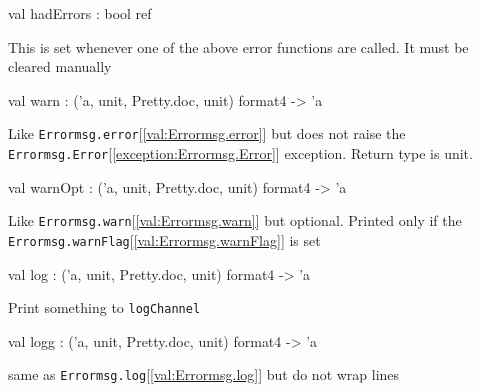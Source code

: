 \documentclass[11pt]{article}
\begin{document}
\label{val:Errormsg.hadErrors}\begin{ocamldoccode}
val hadErrors : bool ref
\end{ocamldoccode}
\begin{ocamldocdescription}
This is set whenever one of the above error functions are called. It must
    be cleared manually


\end{ocamldocdescription}




\label{val:Errormsg.warn}\begin{ocamldoccode}
val warn : ('a, unit, Pretty.doc, unit) format4 -> 'a
\end{ocamldoccode}
\begin{ocamldocdescription}
Like {\tt{Errormsg.error}}[\ref{val:Errormsg.error}] but does not raise the {\tt{Errormsg.Error}}[\ref{exception:Errormsg.Error}] 
 exception. Return type is unit.


\end{ocamldocdescription}




\label{val:Errormsg.warnOpt}\begin{ocamldoccode}
val warnOpt : ('a, unit, Pretty.doc, unit) format4 -> 'a
\end{ocamldoccode}
\begin{ocamldocdescription}
Like {\tt{Errormsg.warn}}[\ref{val:Errormsg.warn}] but optional. Printed only if the 
 {\tt{Errormsg.warnFlag}}[\ref{val:Errormsg.warnFlag}] is set


\end{ocamldocdescription}




\label{val:Errormsg.log}\begin{ocamldoccode}
val log : ('a, unit, Pretty.doc, unit) format4 -> 'a
\end{ocamldoccode}
\begin{ocamldocdescription}
Print something to {\tt{logChannel}}


\end{ocamldocdescription}




\label{val:Errormsg.logg}\begin{ocamldoccode}
val logg : ('a, unit, Pretty.doc, unit) format4 -> 'a
\end{ocamldoccode}
\begin{ocamldocdescription}
same as {\tt{Errormsg.log}}[\ref{val:Errormsg.log}] but do not wrap lines


\end{ocamldocdescription}
\end{document}
